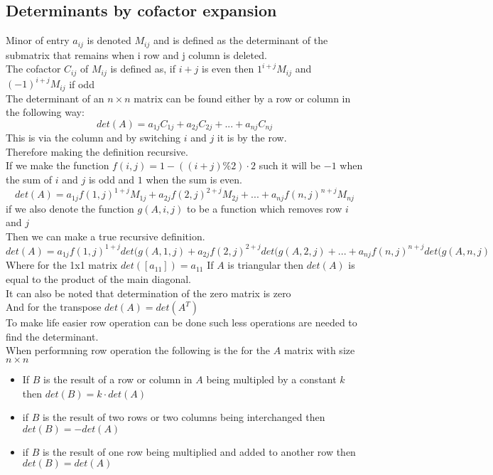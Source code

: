\documentclass[12pt, a4paper]{article}
\begin{document}
		\subsection{Determinants by cofactor expansion}
			Minor of entry $a_{ij}$ is denoted $M_{ij}$ and is defined as the determinant of the submatrix that remains when i row and j column is deleted.\\
			The cofactor $C_{ij}$ of $M_{ij}$ is defined as, if $i+j$ is even then $1^{i+j}M_{ij}$ and $(-1)^{i+j}M_{ij}$ if odd\\
			The determinant of an $n\times n$ matrix can be found either by a row or column in the following way:
			$$det(A)=a_{1j}C_{1j}+a_{2j}C_{2j}+...+a_{nj}C_{nj}$$
			This is via the column and by switching $i$ and $j$ it is by the row.\\
			Therefore making the definition recursive.\\
			If we make the function $f(i,j)=1 - ((i+j) \% 2 ) \cdot 2$ such it will be $-1$ when the sum of $i$ and $j$ is odd and $1$ when the sum is even.
			$$det(A)=a_{1j}f(1,j)^{1+j}M_{1j}+a_{2j}f(2,j)^{2+j}M_{2j}+...+a_{nj}f(n,j)^{n+j}M_{nj}$$
			if we also denote the function $g(A,i,j)$ to be a function which removes row $i$ and $j$\\
			Then we can make a true recursive definition.\\
			$$det(A)=a_{1j}f(1,j)^{1+j}det(g(A,1,j)+a_{2j}f(2,j)^{2+j}det(g(A,2,j)+...+a_{nj}f(n,j)^{n+j}det(g(A,n,j)$$
			Where for the 1x1 matrix $det([a_{11}])=a_{11}$
			If $A$ is triangular then $det(A)$ is equal to the product of the main diagonal.\\[4mm]
			It can also be noted that determination of the zero matrix is zero\\
			And for the transpose $det(A)=det(A^T)$\\[4mm]
			To make life easier row operation can be done such less operations are needed to find the determinant.\\
			When performning row operation the following is the for the $A$ matrix with size $n\times n$
			\begin{itemize}
				\item If $B$ is the result of a row or column in $A$ being multipled by a constant $k$ then $det(B)=k\cdot det(A)$
				\item if $B$ is the result of two rows or two columns being interchanged then $det(B)=-det(A)$
				\item if $B$ is the result of one row being multiplied and added to another row then $det(B)=det(A)$
			\end{itemize}
\end{document}
